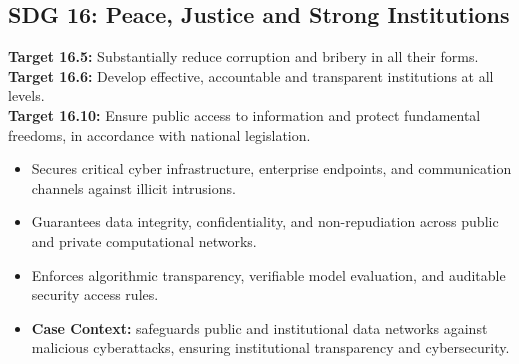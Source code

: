 \subsection{SDG 16: Peace, Justice and Strong Institutions}
\noindent\textbf{Target 16.5:} Substantially reduce corruption and bribery in all their forms. \\
\noindent\textbf{Target 16.6:} Develop effective, accountable and transparent institutions at all levels. \\
\noindent\textbf{Target 16.10:} Ensure public access to information and protect fundamental freedoms, in accordance with national legislation.
\begin{itemize}
  \item Secures critical cyber infrastructure, enterprise endpoints, and communication channels against illicit intrusions.
  \item Guarantees data integrity, confidentiality, and non-repudiation across public and private computational networks.
  \item Enforces algorithmic transparency, verifiable model evaluation, and auditable security access rules.
  \item \textbf{Case Context:} safeguards public and institutional data networks against malicious cyberattacks, ensuring institutional transparency and cybersecurity.
\end{itemize}
